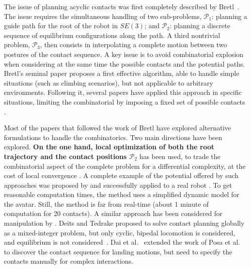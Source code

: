 \documentclass[journal]{IEEEtran}
\begin{document}
The issue of planning acyclic contacts was first completely described by Bretl~\cite{Bretl:2006:MPM:1124573.1124585}. The issue requires the simultaneous handling of two sub-problems, $\mathcal{P}_1$: planning a guide path for the root of the robot in $SE(3)$; and $\mathcal{P}_2$: planning a discrete sequence of equilibrium configurations along the path. A third nontrivial problem, $\mathcal{P}_3$, 
then consists in interpolating a complete motion between two postures of the contact sequence.  A key issue is to avoid combinatorial explosion when considering at the same time the possible contacts and the potential paths. Bretl's seminal paper proposes a first effective algorithm, able to handle simple situations (such as climbing scenarios), but not applicable to arbitrary environments. Following it, seve\-ral papers have applied this approach in specific situations, limiting the combinatorial by imposing a fixed set of possible contacts \citep{Hauser06usingmotion, stilman2010}.

Most of the papers that followed the work of Bretl have explored alternative formulations to handle the combinatorics. Two main directions have been explored. \textbf{On the one hand, local optimization of both the root trajectory \Pa and the contact positions $\mathcal{P}_2$} has been used, to trade the combinatorial aspect of the complete problem for a differential complexity, at the cost of local convergence \citep{1631739}. A complete example of the potential offered by such approaches was proposed by \cite{Mordatch:2012:DCB:2185520.2185539} and successfully applied to a real robot \citep{mordatch2015}. To get reasonable computation times, the method uses a simplified dynamic model for the avatar. Still, the method is far from real-time  (about 1 minute of computation for 20 contacts).  A similar approach has been considered for manipulation by \cite{gabicciniisrr15}. Deits and Tedrake proposed to solve contact planning globally as a mixed-integer problem, but only cyclic, bipedal locomotion is considered, and equilibrium is not considered~\cite{DBLP:conf/humanoids/DeitsT14}. 
Dai et al.~\cite{dai2014whole} extended the work of Posa et al.~\cite{Posa:2014:DMT:2568343.2568352} to discover the contact sequence for landing motions, but need to specify
the contacts manually for complex interactions.
\end{document}

